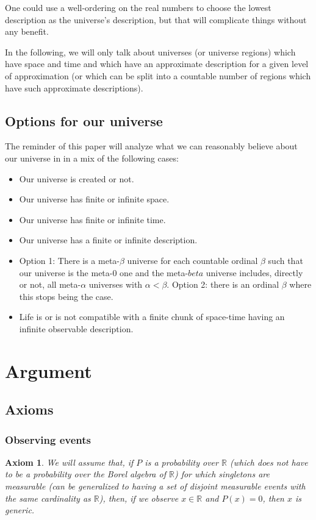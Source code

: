 \documentclass[a4paper
,draft
]{article}
\newcommand{\svn}[2][]{\todo[author=Virgil,color=red!25!white,#1]{#2}}
\def\reale{\mathbb{R}}
\newtheorem{axiom}{Axiom}
\begin{document}
One could use a well-ordering on the real numbers to choose the
lowest description as the universe's description, but that will
complicate things without any benefit.

In the following, we will only talk about universes (or universe regions)
which have space and time and which have an approximate description
for a given level of approximation (or which can be split into
a countable number of regions which have such approximate descriptions).
\svn{What did I just say here?}

\subsection{Options for our universe}

The reminder of this paper will analyze what we can reasonably believe about
our universe in in a mix of the following cases:
\begin{itemize}
  \item Our universe is created or not.
  \item Our universe has finite or infinite space.
  \item Our universe has finite or infinite time.
  \item Our universe has a finite or infinite description.
  \item Option 1: There is a meta-$\beta$ universe for each countable ordinal
        $\beta$ such that our universe is the meta-$0$ one and the meta-$beta$
        universe includes, directly or not, all meta-$\alpha$ universes with
        $\alpha < \beta$. Option 2: there is an ordinal $\beta$ where this
        stops being the case.
  \item Life is or is not compatible with a finite chunk of space-time having
        an infinite observable description.
\end{itemize}

\section{Argument}

\subsection{Axioms}
\subsubsection{Observing events}
\begin{axiom}
  We will assume that, if $P$ is a probability over $\reale$
  (which does not have to be a probability over the Borel algebra of $\reale$)
  for which singletons are measurable (can be generalized to having a set of
  disjoint measurable events with the same cardinality as $\reale$), then,
  if we observe $x\in\reale$ and $P(x)=0$, then $x$ is generic.
\end{axiom}
\end{document}
